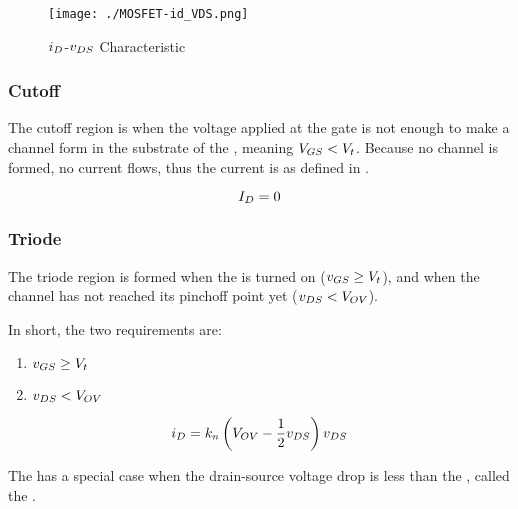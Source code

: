 \begin{figure}[h!tbp]
  \centering
  \texttt{[image: ./MOSFET-id\_VDS.png]}
  \caption{$i_{D}$-$v_{DS}$   Characteristic \parencite[p.~266]{sedraTextbook7}}
  \label{fig:MOSFET-Current_Voltage_Characteristic}
\end{figure}

\subsubsection{Cutoff}\label{subsubsec:MOSFET_Cutoff_Region}
The cutoff region is when the voltage applied at the gate is not enough to make a channel form in the substrate of the , meaning $V_{GS} < V_{t}$.
Because no channel is formed, no current flows, thus the current is as defined in .

\begin{equation}\label{eq:MOSFET_Cutoff_Region-Current}
  I_{D} = 0
\end{equation}

\subsubsection{Triode}\label{subsubsec:MOSFET_Triode_Region}
The triode region is formed when the  is turned on ($v_{GS} \geq V_{t}$), and when the channel has not reached its pinchoff point yet ($v_{DS} < V_{OV}$).

In short, the two requirements are:
\begin{enumerate}[noitemsep]
\item $v_{GS} \geq V_{t}$
\item $v_{DS} < V_{OV}$
\end{enumerate}

\begin{equation}\label{eq:MOSFET_Triode_Region-Current}
  i_{D} = k_{n} \left( V_{OV} - \frac{1}{2} v_{DS} \right) v_{DS}
\end{equation}

The  has a special case when the drain-source voltage drop is less than the , called the .

